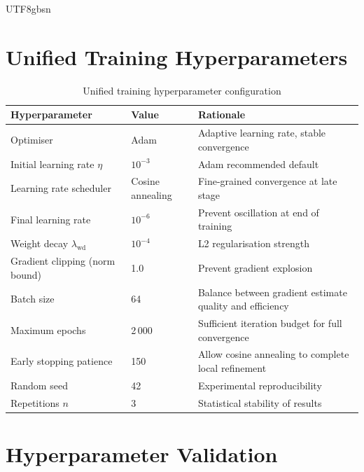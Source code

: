 \documentclass[a4paper,12pt]{report}
\begin{document}
\begin{CJK}{UTF8}{gbsn}
\section{Unified Training Hyperparameters}
\label{sec:hyperparams}

\begin{table}[H]
  \centering
  \caption{Unified training hyperparameter configuration}
  \label{tab:hyperparams}
  \begin{tabularx}{\textwidth}{llX}
    \toprule
    \textbf{Hyperparameter} & \textbf{Value} & \textbf{Rationale} \\
    \midrule
    Optimiser & Adam & Adaptive learning rate, stable convergence \\
    Initial learning rate $\eta$ & $10^{-3}$ & Adam recommended default \\
    Learning rate scheduler & Cosine annealing & Fine-grained convergence at late stage \\
    Final learning rate & $10^{-6}$ & Prevent oscillation at end of training \\
    Weight decay $\lambda_{\text{wd}}$ & $10^{-4}$ & L2 regularisation strength \\
    Gradient clipping (norm bound) & 1.0 & Prevent gradient explosion \\
    Batch size & 64 & Balance between gradient estimate quality and efficiency \\
    Maximum epochs & 2\,000 & Sufficient iteration budget for full convergence \\
    Early stopping patience & 150 & Allow cosine annealing to complete local refinement \\
    Random seed & 42 & Experimental reproducibility \\
    Repetitions $n$ & 3 & Statistical stability of results \\
    \bottomrule
  \end{tabularx}
\end{table}

\section{Hyperparameter Validation}
\label{sec:hyperp_validation}


\end{CJK}
\end{document}
